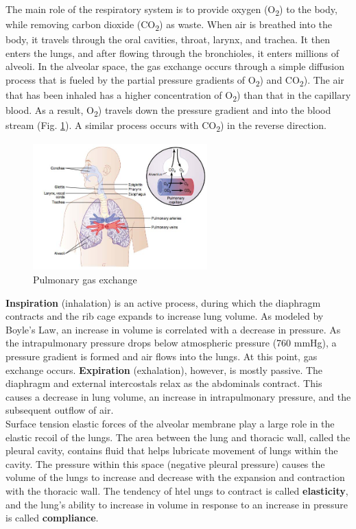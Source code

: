 \documentclass{article}
\begin{document}
The main role of the respiratory system is to provide oxygen (O\textsubscript{2}) to the body, while removing carbon dioxide (CO\textsubscript{2}) as waste. When air is breathed into the body, it travels through the oral cavities, throat, larynx, and trachea. It then enters the lungs, and after flowing through the bronchioles, it enters millions of alveoli. In the alveolar space, the gas exchange occurs through a simple diffusion process that is fueled by the partial pressure gradients of O\textsubscript{2}) and CO\textsubscript{2}). The air that has been inhaled has a higher concentration of O\textsubscript{2}) than that in the capillary blood. As a result, O\textsubscript{2}) travels down the pressure gradient and into the blood stream (Fig. \ref{exchange}). A similar process occurs with CO\textsubscript{2}) in the reverse direction.

\begin{figure}[h]
\centering\includegraphics[width=0.6\textwidth]{../images/PF_I_2.jpg}
\caption{Pulmonary gas exchange}
\label{exchange}
\end{figure}

\textbf{Inspiration} (inhalation) is an active process, during which the diaphragm contracts and the rib cage expands to increase lung volume. As modeled by Boyle's Law, an increase in volume is correlated with a decrease in pressure. As the intrapulmonary pressure drops below atmospheric pressure (760 mmHg), a pressure gradient is formed and air flows into the lungs. At this point, gas exchange occurs. \textbf{Expiration} (exhalation), however, is mostly passive. The diaphragm and external intercostals relax as the abdominals contract. This causes a decrease in lung volume, an increase in intrapulmonary pressure, and the subsequent outflow of air.\\

Surface tension elastic forces of the alveolar membrane play a large role in the elastic recoil of the lungs. The area between the lung and thoracic wall, called the pleural cavity, contains fluid that helps lubricate movement of lungs within the cavity. The pressure within this space (negative pleural pressure) causes the volume of the lungs to increase and decrease with the expansion and contraction with the thoracic wall. The tendency of htel ungs to contract is called \textbf{elasticity}, and the lung's ability to increase in volume in response to an increase in pressure is called \textbf{compliance}.
\end{document}

